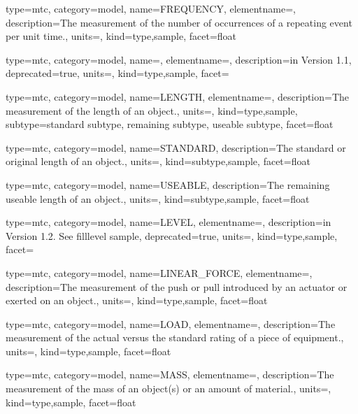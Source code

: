 {
  type=mtc,
  category=model,
  name={FREQUENCY},
  elementname=,
  description={The measurement of the number of occurrences of a repeating event per unit time.},
  units=,
  kind={type,sample},
  facet={\gls{float}}
}


{
  type=mtc,
  category=model,
  name=,
  elementname=,
  description={\DEPRECATED in Version 1.1},
  deprecated={true},
  units={},
  kind={type,sample},
  facet={}
}


{
  type=mtc,
  category=model,
  name={LENGTH},
  elementname=,
  description={The measurement of the length of an object.},
  units=,
  kind={type,sample},
  subtype={\gls{standard subtype}, \gls{remaining subtype}, \gls{useable subtype}},
  facet={\gls{float}}
}


{
  type=mtc,
  category=model,
  name={STANDARD},
  description={The standard or original length of an object.},
  units=,
  kind={subtype,sample},
  facet={\gls{float}}
}


{
  type=mtc,
  category=model,
  name={USEABLE},
  description={The remaining useable length of an object.},
  units=,
  kind={subtype,sample},
  facet={\gls{float}}
}


{
  type=mtc,
  category=model,
  name={LEVEL},
  elementname=,
  description={\DEPRECATED in Version 1.2.  See \gls{filllevel sample}},
  deprecated={true},
  units={},
  kind={type,sample},
  facet={}
}


{
  type=mtc,
  category=model,
  name={LINEAR\_FORCE},
  elementname=,
  description={The measurement of the push or pull introduced by an actuator or exerted on an object.},
  units=,
  kind={type,sample},
  facet={\gls{float}}
}


{
  type=mtc,
  category=model,
  name={LOAD},
  elementname=,
  description={The measurement of the actual versus the standard rating of a piece of equipment.},
  units=,
  kind={type,sample},
  facet={\gls{float}}
}


{
  type=mtc,
  category=model,
  name={MASS},
  elementname=,
  description={The measurement of the mass of an object(s) or an amount of material.},
  units=,
  kind={type,sample},
  facet={\gls{float}}
}


